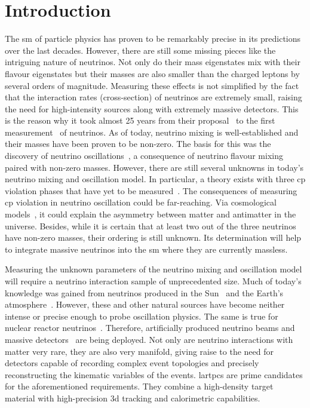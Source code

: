 \chapter{Introduction}
\label{chap:introduction}

The \gls{sm} of particle physics has proven to be remarkably precise in its predictions over the last decades.
However, there are still some missing pieces like the intriguing nature of neutrinos.
Not only do their mass eigenstates mix with their flavour eigenstates but their masses are also smaller than the charged leptons by several orders of magnitude.
Measuring these effects is not simplified by the fact that the interaction rates (cross-section) of neutrinos are extremely small, raising the need for high-intensity sources along with extremely massive detectors.
This is the reason why it took almost \num{25} years from their proposal~\cite{pauliLetter} to the first measurement~\cite{reinesCowan} of neutrinos.
As of today, neutrino mixing is well-established and their masses have been proven to be non-zero.
The basis for this was the discovery of neutrino oscillations~\cite{superKAtmos1, superKAtmos2, snoSolar}, a consequence of neutrino flavour mixing~\cite{pontecorvo, makiNakagawaSakata} paired with non-zero masses.
However, there are still several unknowns in today's neutrino mixing and oscillation model.
In particular, a theory exists with three \gls{cp} violation phases that have yet to be measured~\cite{pontecorvo, makiNakagawaSakata, mariuana}.
The consequences of measuring \gls{cp} violation in neutrino oscillation could be far-reaching.
Via cosmological models~\cite{pdg}, it could explain the asymmetry between matter and antimatter in the universe.
Besides, while it is certain that at least two out of the three neutrinos have non-zero masses, their ordering is still unknown.
Its determination will help to integrate massive neutrinos into the \gls{sm} where they are currently massless.

Measuring the unknown parameters of the neutrino mixing and oscillation model will require a neutrino interaction sample of unprecedented size.
Much of today's knowledge was gained from neutrinos produced in the Sun~\cite{homestake68, homestake98, snoSolar} and the Earth's atmosphere~\cite{superKAtmos1, superKAtmos2}.
However, these and other natural sources have become neither intense or precise enough to probe oscillation physics.
The same is true for nuclear reactor neutrinos~\cite{reinesCowan, dayabayRecent}.
Therefore, artificially produced neutrino beams and massive detectors~\cite{t2kOsc} are being deployed.
Not only are neutrino interactions with matter very rare, they are also very manifold, giving raise to the need for detectors capable of recording complex event topologies and precisely reconstructing the kinematic variables of the events.
\glspl{lartpc} are prime candidates for the aforementioned requirements.
They combine a high-density target material with high-precision \gls{3d} tracking and calorimetric capabilities.

